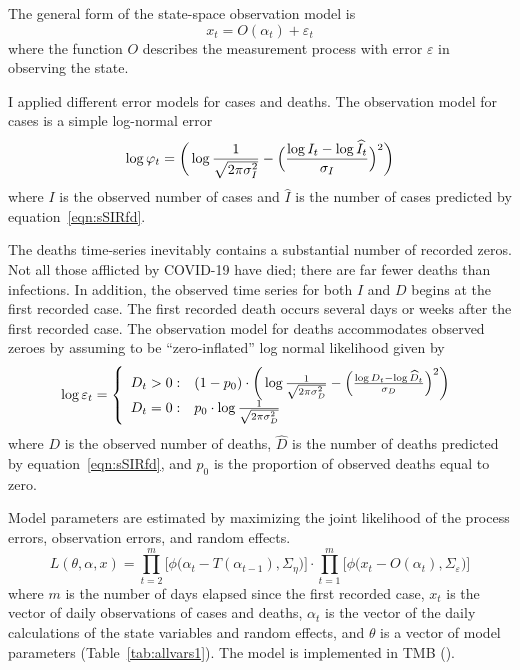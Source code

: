 \documentclass[12pt,letterpaper]{article}
\begin{document}
The general form of the state-space observation model is
\begin{equation}
x_t = O(\alpha_t) + \varepsilon_t
\end{equation}
where the function $O$ describes the measurement process with
error $\varepsilon$ in observing the state.

I applied different error models for cases and
deaths. The observation model for cases is a simple log-normal error
\begin{equation}
\log\varphi_t = \bigg(\log\frac{1}{\sqrt{2\pi\sigma^2_I}} -\Bigl(\frac{\log
I_t-\log\widehat{I}_t}{\sigma_I}\Bigr)^2\bigg)\\
\end{equation}
where $I$ is the observed number of cases and $\widehat{I}$ is the
number of cases predicted by equation~\ref{eqn:sSIRfd}.

The deaths time-series inevitably contains a
substantial number of recorded zeros. 
Not all those afflicted by COVID-19 have died; there are far fewer
deaths than infections. In addition,
the observed time series for both $I$ and $D$ begins at the first recorded
case. The first recorded death occurs several days or weeks after the
first recorded case. 
The observation model for deaths accommodates observed zeroes by
assuming to be ``zero-inflated'' log normal likelihood given by
\begin{equation}
  \log \varepsilon_t = \left\{
    \begin{array}{r@{\;:\quad}l}
       D_t > 0 &
(1-p_0)\cdot\bigg(\log\frac{1}{\sqrt{2\pi\sigma^2_D}}
          -\Bigl(\frac{\log D_t-\log\widehat{D}_t}{\sigma_D}\Bigr)^2\bigg)\\
       D_t = 0 & p_0 \cdot\log \frac{1}{\sqrt{2\pi\sigma^2_D}}\\
    \end{array}
  \right.
\end{equation}
where $D$ is the observed number of deaths,
$\widehat{D}$ is the number of deaths predicted by
equation~\ref{eqn:sSIRfd}, 
and $p_0$ is the proportion of observed deaths equal to zero.

\cite{Sibert2017,Nielsen2014b}


Model parameters are estimated by
maximizing the joint likelihood of the process errors, observation
errors, and random effects.
\begin{equation}
\label{eqn:likelihood}
L(\theta,\alpha,x)=
\prod^m_{t=2}\big[\phi\big(\alpha_t-T(\alpha_{t-1}), \Sigma_\eta\big)\big]\cdot
\prod^m_{t=1}\big[\phi\big(x_t-O(\alpha_t),
\Sigma_\varepsilon\big)\big]
\end{equation}
where $m$ is the number of days elapsed since the first recorded case,
$x_t$ is the vector of daily observations of cases and deaths,
$\alpha_t$ is the vector of the daily calculations of the state
variables and random effects,
and $\theta$ 
is a vector of model parameters (Table~\ref{tab:allvars1}).
The model is implemented in TMB (\cite{TMB0000}).
\end{document}

